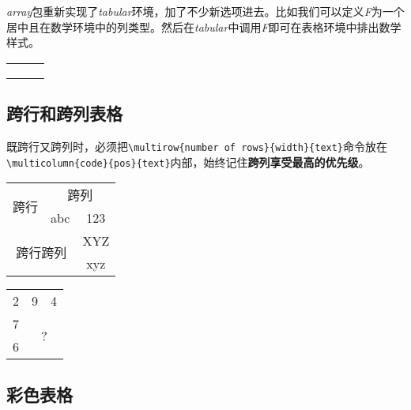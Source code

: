 \emph{array}包重新实现了\emph{tabular}环境，加了不少新选项进去。比如我们可以定义\emph{F}为一个居中且在数学环境中的列类型。然后在\emph{tabular}中调用\emph{F}即可在表格环境中排出数学样式。

\begin{codeshow}
\centering
\begin{tabular}{FFF}
    \alpha & \beta    & \gamma   \\
    \delta & \epsilon & \upsilon \\
    \sigma & \tau     & \phi     \\
\end{tabular}
\end{codeshow}

\subsection{跨行和跨列表格}


既跨行又跨列时，必须把\lstinline|\multirow{number of rows}{width}{text}|命令放在\lstinline|\multicolumn{code}{pos}{text}|内部，始终记住\textbf{跨列享受最高的优先级}。

\begin{codeshow}
\centering
\begin{tabular}{|c|c|c|}
    \hline
    \multirow{2}{*}{跨行} & \multicolumn{2}{c|}{跨列} \\ \cline{2-3}
     & abc & 123 \\ \hline
    \multicolumn{2}{|c|}{\multirow{2}{*}{跨行跨列}} & XYZ \\ \cline{3-3}
    \multicolumn{2}{|c|}{} & xyz \\ \hline
\end{tabular}
\end{codeshow}

\begin{codeshow}
\centering
\begin{tabular}{|ccc|}
    \hline
    2 & 9 & 4 \\
    7 & \multicolumn{2}{c|}{\multirow{2}{*}{?}}\\
    6& & \\ \hline
\end{tabular}
\end{codeshow}

\subsection{彩色表格}

